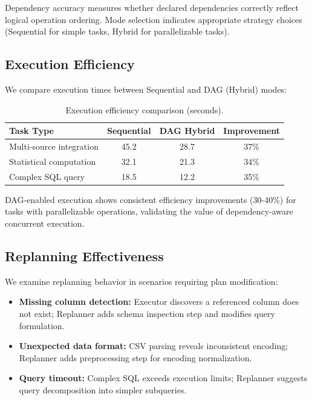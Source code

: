 \documentclass{article}
\theoremstyle{definition}
\begin{document}
Dependency accuracy measures whether declared dependencies correctly reflect logical operation ordering. Mode selection indicates appropriate strategy choices (Sequential for simple tasks, Hybrid for parallelizable tasks).

\subsection{Execution Efficiency}

We compare execution times between Sequential and DAG (Hybrid) modes:

\begin{table}[t]
\centering
\caption{Execution efficiency comparison (seconds).}
\label{tab:exec-efficiency}
\begin{tabular}{lccc}
\toprule
Task Type & Sequential & DAG Hybrid & Improvement \\
\midrule
Multi-source integration & 45.2 & 28.7 & 37\% \\
Statistical computation & 32.1 & 21.3 & 34\% \\
Complex SQL query & 18.5 & 12.2 & 35\% \\
\bottomrule
\end{tabular}
\end{table}

DAG-enabled execution shows consistent efficiency improvements (30-40\%) for tasks with parallelizable operations, validating the value of dependency-aware concurrent execution.

\subsection{Replanning Effectiveness}

We examine replanning behavior in scenarios requiring plan modification:

\begin{itemize}[leftmargin=1.5em]
    \item \textbf{Missing column detection:} Executor discovers a referenced column does not exist; Replanner adds schema inspection step and modifies query formulation.
    \item \textbf{Unexpected data format:} CSV parsing reveals inconsistent encoding; Replanner adds preprocessing step for encoding normalization.
    \item \textbf{Query timeout:} Complex SQL exceeds execution limits; Replanner suggests query decomposition into simpler subqueries.
\end{itemize}
\end{document}
